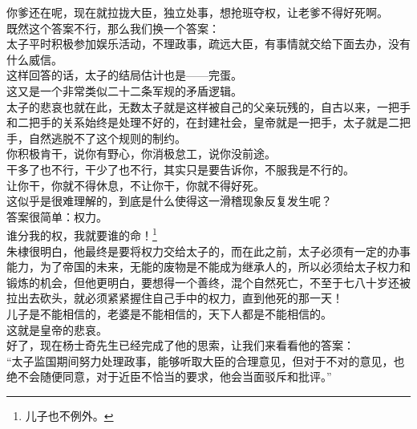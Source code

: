 \begin{multicols}{\theparacolNo}
你爹还在呢，现在就拉拢大臣，独立处事，想抢班夺权，让老爹不得好死啊。\\

既然这个答案不行，那么我们换一个答案：\\

太子平时积极参加娱乐活动，不理政事，疏远大臣，有事情就交给下面去办，没有什么威信。\\

这样回答的话，太子的结局估计也是——完蛋。\\

这又是一个非常类似二十二条军规的矛盾逻辑。\\

太子的悲哀也就在此，无数太子就是这样被自己的父亲玩残的，自古以来，一把手和二把手的关系始终是处理不好的，在封建社会，皇帝就是一把手，太子就是二把手，自然逃脱不了这个规则的制约。\\

你积极肯干，说你有野心，你消极怠工，说你没前途。\\

干多了也不行，干少了也不行，其实只是要告诉你，不服我是不行的。\\

让你干，你就不得休息，不让你干，你就不得好死。\\

这似乎是很难理解的，到底是什么使得这一滑稽现象反复发生呢？\\

答案很简单：权力。\\

谁分我的权，我就要谁的命！\footnote{儿子也不例外。}\\

朱棣很明白，他最终是要将权力交给太子的，而在此之前，太子必须有一定的办事能力，为了帝国的未来，无能的废物是不能成为继承人的，所以必须给太子权力和锻炼的机会，但他更明白，要想得一个善终，混个自然死亡，不至于七八十岁还被拉出去砍头，就必须紧紧握住自己手中的权力，直到他死的那一天！\\

儿子是不能相信的，老婆是不能相信的，天下人都是不能相信的。\\

这就是皇帝的悲哀。\\

好了，现在杨士奇先生已经完成了他的思索，让我们来看看他的答案：\\

“太子监国期间努力处理政事，能够听取大臣的合理意见，但对于不对的意见，也绝不会随便同意，对于近臣不恰当的要求，他会当面驳斥和批评。”\\


\end{multicols}
